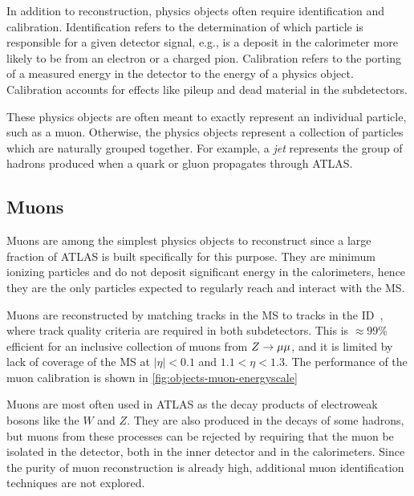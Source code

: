 In addition to reconstruction, physics objects often require identification and calibration. Identification refers to the determination of which particle is responsible for a given detector signal, e.g., is a deposit in the calorimeter more likely to be from an electron or a charged pion. Calibration refers to the porting of a measured energy in the detector to the energy of a physics object. Calibration accounts for effects like pileup and dead material in the subdetectors.

These physics objects are often meant to exactly represent an individual particle, such as a muon. Otherwise, the physics objects represent a collection of particles which are naturally grouped together. For example, a \textit{jet} represents the group of hadrons produced when a quark or gluon propagates through ATLAS.

\subsection{Muons}

Muons are among the simplest physics objects to reconstruct since a large fraction of ATLAS is built specifically for this purpose. They are minimum ionizing particles and do not deposit significant energy in the calorimeters, hence they are the only particles expected to regularly reach and interact with the MS. 

Muons are reconstructed by matching tracks in the MS to tracks in the ID~\cite{PERF-2014-05}, where track quality criteria are required in both subdetectors. This is $\approx\! 99$\% efficient for an inclusive collection of muons from $Z \rightarrow \mu\mu$, and it is limited by lack of coverage of the MS at $|\eta| < 0.1$ and $1.1 < \eta < 1.3$. The performance of the muon calibration is shown in \cref{fig:objects-muon-energyscale}

Muons are most often used in ATLAS as the decay products of electroweak bosons like the $W$ and $Z$. They are also produced in the decays of some hadrons, but muons from these processes can be rejected by requiring that the muon be isolated in the detector, both in the inner detector and in the calorimeters. Since the purity of muon reconstruction is already high, additional muon identification techniques are not explored.


